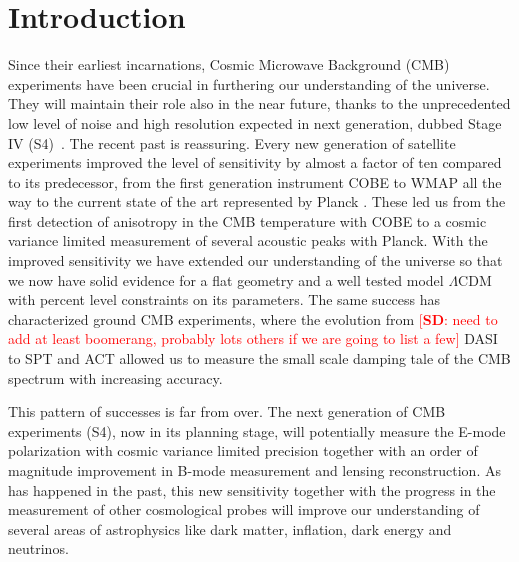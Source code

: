 \documentclass[aps,prd,reprint,superscriptaddress]{revtex4-1}
\newcommand{\sd}[1]{\textcolor{red}{[{\bf SD}: #1]}}
\begin{document}
\section{Introduction}\label{sec:intro}
Since their earliest incarnations, Cosmic Microwave Background (CMB) experiments have been crucial in furthering our understanding of the universe. They will maintain their role also in the near future, thanks to the unprecedented low level of noise and high resolution expected in next generation, dubbed Stage IV (S4)~\cite{2013arXiv1309.5383A}.
The recent past is  reassuring. Every new generation of satellite experiments improved the level of sensitivity by almost a factor of ten compared to its predecessor, from the first generation instrument COBE to WMAP all the way to the current state of the art represented by Planck \cite{2015arXiv150201589P,2014A&A...571A..16P,2003ApJS..148..175S,2000ApJ...545L...5H,2000Natur.404..955D}.
These led us from the first detection of anisotropy in the CMB temperature with COBE to a cosmic variance limited measurement of several acoustic peaks with Planck. With the improved sensitivity we have extended our understanding of the universe so that we now have solid evidence for a flat geometry and a well tested model $\Lambda$CDM with percent level constraints on its parameters.
The same success has characterized ground CMB experiments, where the evolution from \sd{need to add at least boomerang, probably lots others if we are going to list a few} DASI \cite{2002ApJ...568...38H} to SPT and ACT \cite{2011ApJ...739...52D} \cite{2011ApJ...743...28K} allowed us to measure the small scale damping tale of the CMB spectrum with increasing accuracy.

This pattern of successes is far from over. The next generation of CMB experiments (S4), now in its planning stage, will potentially measure the E-mode polarization with cosmic variance limited precision together with an order of magnitude improvement in B-mode measurement and lensing reconstruction. As has happened in the past, this new sensitivity together with the progress in the measurement of other cosmological probes will improve our understanding of several areas of astrophysics like dark matter, inflation, dark energy and neutrinos. 
\end{document}
